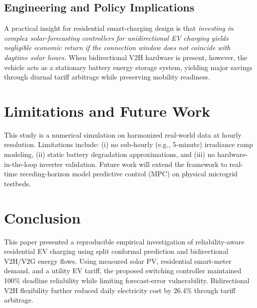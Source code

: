 \documentclass[conference]{IEEEtran}
\begin{document}
\subsection{Engineering and Policy Implications}
A practical insight for residential smart-charging design is that \textit{investing in complex solar-forecasting controllers for unidirectional EV charging yields negligible economic return if the connection window does not coincide with daytime solar hours.} When bidirectional V2H hardware is present, however, the vehicle acts as a stationary battery energy storage system, yielding major savings through diurnal tariff arbitrage while preserving mobility readiness.

\section{Limitations and Future Work}
This study is a numerical simulation on harmonized real-world data at hourly resolution. Limitations include: (i) no sub-hourly (e.g., 5-minute) irradiance ramp modeling, (ii) static battery degradation approximations, and (iii) no hardware-in-the-loop inverter validation. Future work will extend the framework to real-time receding-horizon model predictive control (MPC) on physical microgrid testbeds.

\section{Conclusion}
This paper presented a reproducible empirical investigation of reliability-aware residential EV charging using split conformal prediction and bidirectional V2H/V2G energy flows. Using measured solar PV, residential smart-meter demand, and a utility EV tariff, the proposed switching controller maintained 100\% deadline reliability while limiting forecast-error vulnerability. Bidirectional V2H flexibility further reduced daily electricity cost by 26.4\% through tariff arbitrage.

\balance


\end{document}
